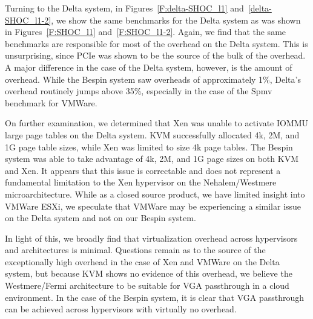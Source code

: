 
Turning to the Delta system, in Figures~\ref{F:delta-SHOC_l1}
and~\ref{delta-SHOC_l1-2}, we show the same benchmarks for the Delta system as
was shown in Figures~\ref{F:SHOC_l1} and~\ref{F:SHOC_l1-2}.  Again, we find that the
same benchmarks are responsible for most of the overhead on the Delta system.  This is
unsurprising, since PCIe was shown to be the source of the bulk of the overhead.
A major difference in the case of the Delta system, however, is the amount of
overhead.  While the Bespin system saw overheads of approximately 1\%, Delta's overhead
routinely jumps above 35\%, especially in the case of the Spmv benchmark for
VMWare.  

On further examination, we determined that Xen was unable to activate
IOMMU large page tables on the Delta system.  KVM successfully allocated 4k, 2M,
and 1G page table sizes, while Xen was limited to size 4k page tables.  The
Bespin system was able to take advantage of 4k, 2M, and 1G page sizes on both
KVM and Xen.  It appears that this issue is correctable and does not represent a
fundamental limitation to the Xen hypervisor on the Nehalem/Westmere
microarchitecture.  While as a closed source product,  we have limited insight
into VMWare ESXi, we speculate that VMWare may be experiencing a similar issue
on the Delta system and not on our Bespin system.



In light of this, we broadly find that virtualization overhead across
hypervisors and architectures is minimal.  Questions remain as to the source of the
exceptionally high overhead in the case of Xen and VMWare on the Delta
system, but because KVM shows no evidence of this overhead, we believe the
Westmere/Fermi architecture to be suitable for VGA passthrough in a cloud
environment.  In the case of the Bespin system, it is clear that VGA passthrough can be
achieved across hypervisors with virtually no overhead.  

